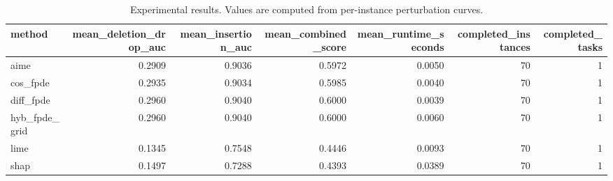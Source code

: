 \begin{table}[t]
\caption{Experimental results. Values are computed from per-instance perturbation curves.}
\label{tab:main_results_computed}
\centering
\begin{tabular}{lrrrrrr}
\toprule
method & mean\_deletion\_drop\_auc & mean\_insertion\_auc & mean\_combined\_score & mean\_runtime\_seconds & completed\_instances & completed\_tasks \\
\midrule
aime & 0.2909 & 0.9036 & 0.5972 & 0.0050 & 70 & 1 \\
cos\_fpde & 0.2935 & 0.9034 & 0.5985 & 0.0040 & 70 & 1 \\
diff\_fpde & 0.2960 & 0.9040 & 0.6000 & 0.0039 & 70 & 1 \\
hyb\_fpde\_grid & 0.2960 & 0.9040 & 0.6000 & 0.0060 & 70 & 1 \\
lime & 0.1345 & 0.7548 & 0.4446 & 0.0093 & 70 & 1 \\
shap & 0.1497 & 0.7288 & 0.4393 & 0.0389 & 70 & 1 \\
\bottomrule
\end{tabular}

\end{table}
